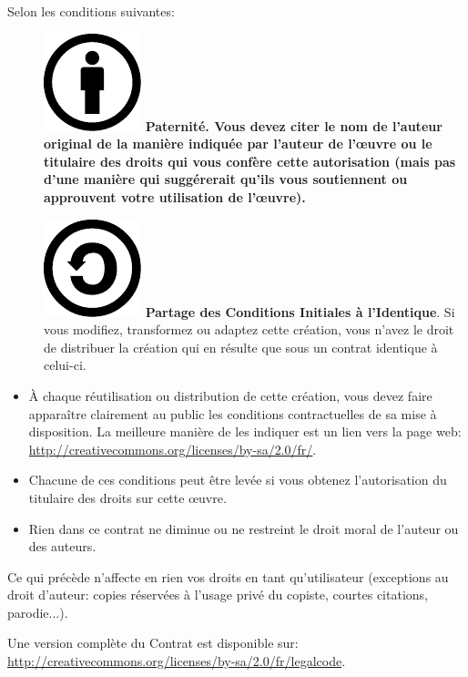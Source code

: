 \bigskip
Selon les conditions suivantes:
\begin{description}
\item[] \includegraphics[scale=0.2]{images/Cc-by_new.pdf}\bf{} Paternité\rm{}. Vous devez citer le nom de l'auteur original de la manière indiquée par l'auteur de l'œuvre ou le titulaire des droits qui vous confère cette autorisation (mais pas d'une manière qui suggérerait qu'ils vous soutiennent ou approuvent votre utilisation de l'œuvre).
\item[] \includegraphics[scale=0.2]{images/sa.pdf} \textbf{Partage des Conditions Initiales à l'Identique}. Si vous modifiez, transformez ou adaptez cette création, vous n'avez le droit de distribuer la création qui en résulte que sous un contrat identique à celui-ci.
\end{description}
\begin{itemize}
\item À chaque réutilisation ou distribution de cette création, vous devez faire apparaître clairement au public
les conditions contractuelles de sa mise à disposition. La meilleure manière de les indiquer est un lien vers la
 page web:\\
\url{http://creativecommons.org/licenses/by-sa/2.0/fr/}.

\item Chacune de ces conditions peut être levée si vous obtenez l'autorisation du titulaire des droits sur cette œuvre.
\item Rien dans ce contrat ne diminue ou ne restreint le droit moral de l'auteur ou des auteurs.
\end{itemize}

\bigskip
Ce qui précède n'affecte en rien vos droits en tant qu'utilisateur (exceptions au droit d'auteur: copies réservées à l'usage privé du copiste, courtes citations, parodie...).

Une version complète du Contrat est disponible sur:\\
\url{http://creativecommons.org/licenses/by-sa/2.0/fr/legalcode}.

